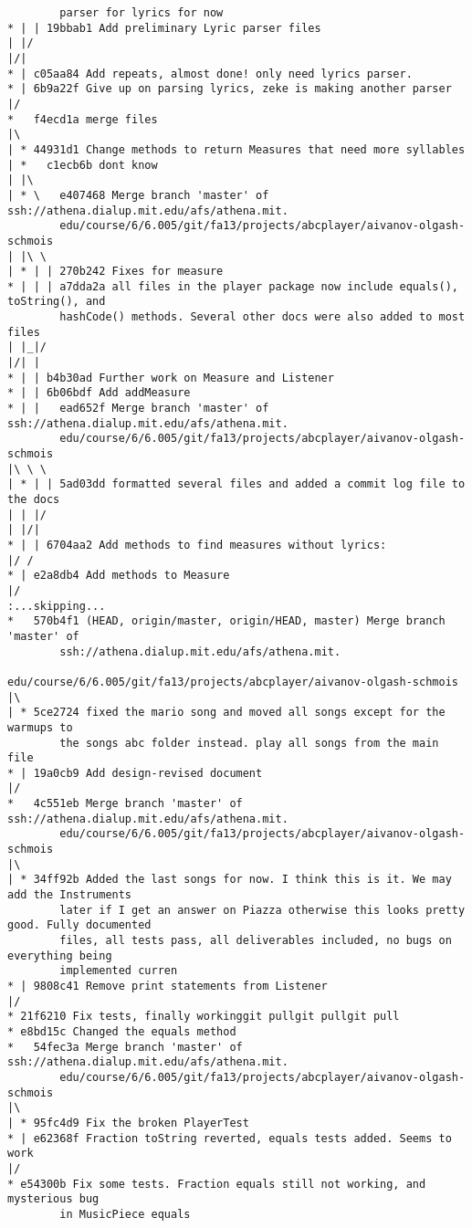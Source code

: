 \documentclass[12pt]{book}
\begin{document}
\begin{Verbatim}
        parser for lyrics for now
* | | 19bbab1 Add preliminary Lyric parser files
| |/
|/|
* | c05aa84 Add repeats, almost done! only need lyrics parser.
* | 6b9a22f Give up on parsing lyrics, zeke is making another parser
|/
*   f4ecd1a merge files
|\
| * 44931d1 Change methods to return Measures that need more syllables
| *   c1ecb6b dont know
| |\
| * \   e407468 Merge branch 'master' of ssh://athena.dialup.mit.edu/afs/athena.mit.
        edu/course/6/6.005/git/fa13/projects/abcplayer/aivanov-olgash-schmois
| |\ \
| * | | 270b242 Fixes for measure
* | | | a7dda2a all files in the player package now include equals(), toString(), and 
        hashCode() methods. Several other docs were also added to most files
| |_|/
|/| |
* | | b4b30ad Further work on Measure and Listener
* | | 6b06bdf Add addMeasure
* | |   ead652f Merge branch 'master' of ssh://athena.dialup.mit.edu/afs/athena.mit.
        edu/course/6/6.005/git/fa13/projects/abcplayer/aivanov-olgash-schmois
|\ \ \
| * | | 5ad03dd formatted several files and added a commit log file to the docs
| | |/
| |/|
* | | 6704aa2 Add methods to find measures without lyrics:
|/ /
* | e2a8db4 Add methods to Measure
|/
:...skipping...
*   570b4f1 (HEAD, origin/master, origin/HEAD, master) Merge branch 'master' of 
        ssh://athena.dialup.mit.edu/afs/athena.mit.
                edu/course/6/6.005/git/fa13/projects/abcplayer/aivanov-olgash-schmois
|\
| * 5ce2724 fixed the mario song and moved all songs except for the warmups to 
        the songs abc folder instead. play all songs from the main file
* | 19a0cb9 Add design-revised document
|/
*   4c551eb Merge branch 'master' of ssh://athena.dialup.mit.edu/afs/athena.mit.
        edu/course/6/6.005/git/fa13/projects/abcplayer/aivanov-olgash-schmois
|\
| * 34ff92b Added the last songs for now. I think this is it. We may add the Instruments 
        later if I get an answer on Piazza otherwise this looks pretty good. Fully documented 
        files, all tests pass, all deliverables included, no bugs on everything being 
        implemented curren
* | 9808c41 Remove print statements from Listener
|/
* 21f6210 Fix tests, finally workinggit pullgit pullgit pull
* e8bd15c Changed the equals method
*   54fec3a Merge branch 'master' of ssh://athena.dialup.mit.edu/afs/athena.mit.
        edu/course/6/6.005/git/fa13/projects/abcplayer/aivanov-olgash-schmois
|\
| * 95fc4d9 Fix the broken PlayerTest
* | e62368f Fraction toString reverted, equals tests added. Seems to work
|/
* e54300b Fix some tests. Fraction equals still not working, and mysterious bug 
        in MusicPiece equals

\end{Verbatim}
\end{document}
